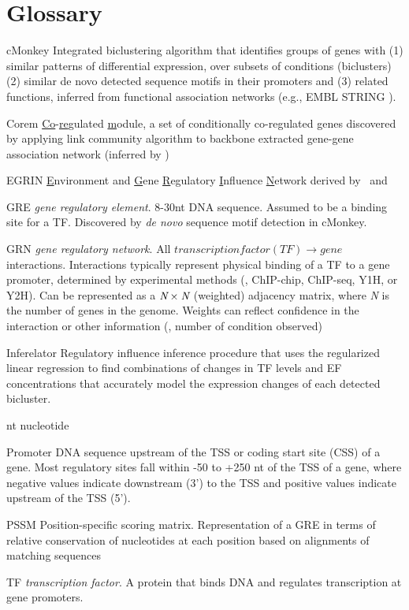 %
%
\tableofcontents
\listoffigures
\listoftables  
 
%
%
\chapter*{Glossary}      %
\thispagestyle{plain}
%
\begin{glossary}
\item[cMonkey] Integrated biclustering algorithm \cite{reiss_integrated_2006} that identifies groups of genes with (1) similar patterns of differential expression, over subsets of conditions (biclusters) (2) similar de novo detected sequence motifs in their promoters and (3) related functions, inferred from functional association networks (e.g., EMBL STRING \cite{szklarczyk_string_2011}).
\item[Corem] \underline{Co}-\underline{re}gulated \underline{m}odule, a set of conditionally co-regulated genes discovered by applying link community algorithm \cite{ahn_link_2010} to backbone extracted \cite{serrano_extracting_2009}  gene-gene association network (inferred by \cm)
\item[EGRIN] \underline{E}nvironment and \underline{G}ene \underline{R}egulatory \underline{I}nfluence \underline{N}etwork derived by \cm\ and \nwinf\
\item[GRE] \emph{gene regulatory element}. 8-30nt DNA sequence. Assumed to be a binding site for a TF. Discovered by \emph{de novo}  sequence motif detection in cMonkey. 
\item[GRN] \emph{gene regulatory network}. All $transcription factor (TF) \rightarrow gene$ interactions. Interactions typically represent physical binding of a TF to a gene promoter, determined by experimental methods (\eg, ChIP-chip, ChIP-seq, Y1H, or Y2H). Can be represented as a $\emph{N} \times \emph{N}$ (weighted) adjacency matrix, where \emph{N} is the number of genes in the genome. Weights can reflect confidence in the interaction or other information (\eg, number of condition observed)
\item[Inferelator] Regulatory influence inference procedure \cite{bonneau_inferelator:_2006} that uses the regularized linear regression to find combinations of changes in TF levels and EF concentrations that accurately model the expression changes of each \cm\-detected bicluster.
\item[nt] nucleotide
\item[Promoter] DNA sequence upstream of the TSS or coding start site (CSS) of a gene. Most regulatory sites fall within -50 to +250 nt of the TSS of a gene, where negative values indicate downstream (3') to the TSS and  positive values indicate upstream of the TSS (5').
\item[PSSM] Position-specific scoring matrix. Representation of a GRE in terms of relative conservation of nucleotides at each position based on alignments of matching sequences
\item[TF] \emph{transcription factor}. A protein that binds DNA and regulates transcription at gene promoters.

\end{glossary}
 
